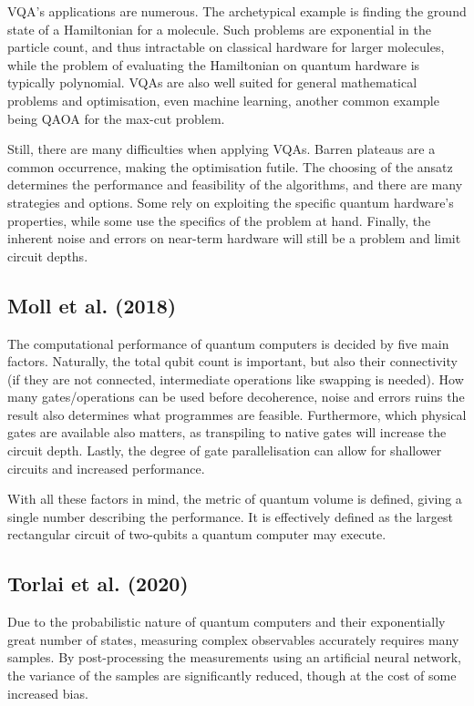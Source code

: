 VQA's applications are numerous. The archetypical example is finding the ground state of a Hamiltonian for a molecule. Such problems are exponential in the particle count, and thus intractable on classical hardware for larger molecules, while the problem of evaluating the Hamiltonian on quantum hardware is typically polynomial. VQAs are also well suited for general mathematical problems and optimisation, even machine learning, another common example being QAOA for the max-cut problem.


Still, there are many difficulties when applying VQAs. Barren plateaus are a common occurrence, making the optimisation futile. The choosing of the ansatz determines the performance and feasibility of the algorithms, and there are many strategies and options. Some rely on exploiting the specific quantum hardware's properties, while some use the specifics of the problem at hand. Finally, the inherent noise and errors on near-term hardware will still be a problem and limit circuit depths.


\subsection{Moll et al. (2018)}
The computational performance of quantum computers is decided by five main factors. Naturally, the total qubit count is important, but also their connectivity (if they are not connected, intermediate operations like swapping is needed). How many gates/operations can be used before decoherence, noise and errors ruins the result also determines what programmes are feasible. Furthermore, which physical gates are available also matters, as transpiling to native gates will increase the circuit depth. Lastly, the degree of gate parallelisation can allow for shallower circuits and increased performance.

With all these factors in mind, the metric of quantum volume is defined, giving a single number describing the performance. It is effectively defined as the largest rectangular circuit of two-qubits a quantum computer may execute.

\subsection{Torlai et al. (2020)}
Due to the probabilistic nature of quantum computers and their exponentially great number of states, measuring complex observables accurately requires  many samples. By post-processing the measurements using an artificial neural network, the variance of the samples are significantly reduced, though at the cost of some increased bias.

